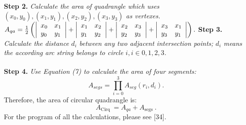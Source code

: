\documentclass[a4paper,fleqn]{cas-dc}
\begin{document}
\textbf{Step 2.} \textit{Calculate the area of quadrangle which uses $(x_0,y_0),(x_1,y_1),(x_2,y_2),(x_3,y_3)$ as vertexes.} \\
$
A_{q a}= \\ \frac{1}{2}\left(\left|
\begin{array}{ll}
x_{0} & x_{1} \\
y_{0} & y_{1}
\end{array}\right
|+\left|\begin{array}{ll}
x_{1} & x_{2} \\
y_{1} & y_{2}
\end{array}\right|+\left|\begin{array}{ll}
x_{2} & x_{3} \\
y_{2} & y_{3}
\end{array}\right|+  \left|\begin{array}{ll}
x_{3} & x_{1} \\
y_{3} & y_{1}
\end{array}\right|\right) .
$
\textbf{Step 3.} \textit{Calculate the distance $d_{i}$ between any two adjacent intersection points; $d_{i}$ means the according arc string belongs to circle $i, i \in 0,1,2,3$.} \\ \\
\textbf{Step 4.} \textit{Use Equation (7) to calculate the area of four segments:}
$$
A_{segs}=\prod_{i=0}^{3} A_{s e g}\left(r_{i}, d_{i}\right) .
$$
Therefore, the area of circular quadrangle is:
$$
A_{\text {Cirq }}=A_{q a}+A_{\text {segs } } .
$$
For the program of all the calculations, please see [34].
\end{document}
